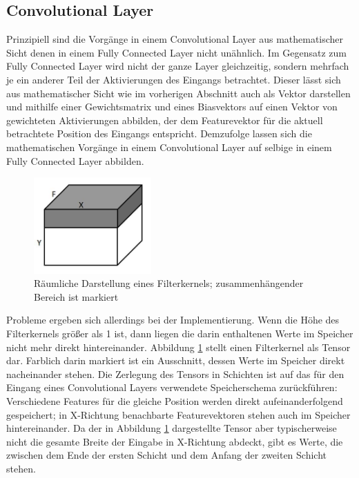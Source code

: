 \documentclass[../main.tex]{subfiles}
\begin{document}
\subsection{Convolutional Layer}
Prinzipiell sind die Vorgänge in einem Convolutional Layer aus mathematischer Sicht denen in einem Fully Connected Layer nicht unähnlich. Im Gegensatz zum Fully Connected Layer wird nicht der ganze Layer gleichzeitig, sondern mehrfach je ein anderer Teil der Aktivierungen des Eingangs betrachtet. Dieser lässt sich aus mathematischer Sicht wie im vorherigen Abschnitt auch als Vektor darstellen und mithilfe einer Gewichtsmatrix und eines Biasvektors auf einen Vektor von gewichteten Aktivierungen abbilden, der dem Featurevektor für die aktuell betrachtete Position des Eingangs entspricht. Demzufolge lassen sich die mathematischen Vorgänge in einem Convolutional Layer auf selbige in einem Fully Connected Layer abbilden. 
\begin{figure}
	\centering 
	\includegraphics[width=0.4\textwidth]{../images/Schmidt/convTensor.jpg} 
	\caption {Räumliche Darstellung eines Filterkernels; zusammenhängender Bereich ist markiert}
	\label{pic:conv_tensor} 
\end{figure} 
Probleme ergeben sich allerdings bei der Implementierung. Wenn die Höhe des Filterkernels größer als 1 ist, dann liegen die darin enthaltenen Werte im Speicher nicht mehr direkt hintereinander. Abbildung \ref{pic:conv_tensor} stellt einen Filterkernel als Tensor dar. Farblich darin markiert ist ein Ausschnitt, dessen Werte im Speicher direkt nacheinander stehen. Die Zerlegung des Tensors in Schichten ist auf das für den Eingang eines Convolutional Layers verwendete Speicherschema zurückführen: Verschiedene Features für die gleiche Position werden direkt aufeinanderfolgend gespeichert; in X-Richtung benachbarte Featurevektoren stehen auch im Speicher hintereinander. Da der in Abbildung \ref{pic:conv_tensor} dargestellte Tensor aber typischerweise nicht die gesamte Breite der Eingabe in X-Richtung abdeckt, gibt es Werte, die zwischen dem Ende der ersten Schicht und dem Anfang der zweiten Schicht stehen. 
\end{document}
